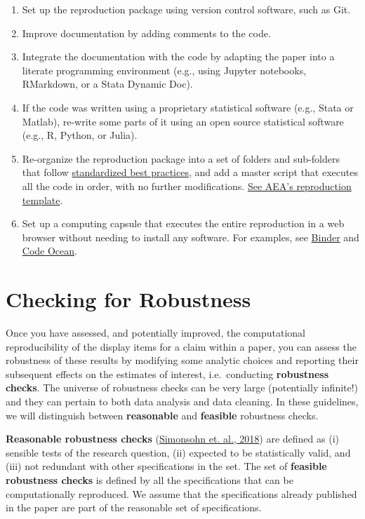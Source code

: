 \documentclass[
]{book}
\providecommand{\tightlist}{%
  \setlength{\itemsep}{0pt}\setlength{\parskip}{0pt}}
\begin{document}
\begin{enumerate}
\def\labelenumi{\arabic{enumi}.}
\tightlist
\item
  Set up the reproduction package using version control software, such as Git.
\item
  Improve documentation by adding comments to the code.
\item
  Integrate the documentation with the code by adapting the paper into a literate programming environment (e.g., using Jupyter notebooks, RMarkdown, or a Stata Dynamic Doc).
\item
  If the code was written using a proprietary statistical software (e.g., Stata or Matlab), re-write some parts of it using an open source statistical software (e.g., R, Python, or Julia).
\item
  Re-organize the reproduction package into a set of folders and sub-folders that follow \href{https://www.projecttier.org/tier-protocol/specifications/\#overview-of-the-documentation}{standardized best practices}, and add a master script that executes all the code in order, with no further modifications. \href{https://github.com/AEADataEditor/replication-template}{See AEA's reproduction template}.\\
\item
  Set up a computing capsule that executes the entire reproduction in a web browser without needing to install any software. For examples, see \href{https://mybinder.org/}{Binder} and \href{https://codeocean.com/}{Code Ocean}.
\end{enumerate}

\hypertarget{robust}{%
\chapter{Checking for Robustness}\label{robust}}

Once you have assessed, and potentially improved, the computational reproducibility of the display items for a claim within a paper, you can assess the robustness of these results by modifying some analytic choices and reporting their subsequent effects on the estimates of interest, i.e.~conducting \textbf{robustness checks}. The universe of robustness checks can be very large (potentially infinite!) and they can pertain to both data analysis and data cleaning. In these guidelines, we will distinguish between \textbf{reasonable} and \textbf{feasible} robustness checks.

\textbf{Reasonable robustness checks} (\href{https://urisohn.com/sohn_files/wp/wordpress/wp-content/uploads/Paper-Specification-curve-2018-11-02.pdf}{Simonsohn et. al., 2018}) are defined as (i) sensible tests of the research question, (ii) expected to be statistically valid, and (iii) not redundant with other specifications in the set. The set of \textbf{feasible robustness checks} is defined by all the specifications that can be computationally reproduced. We assume that the specifications already published in the paper are part of the reasonable set of specifications.
\end{document}
